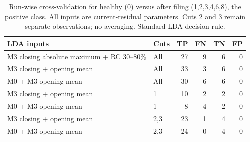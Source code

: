 \begin{table}[t]
\centering\scriptsize
\setlength{\tabcolsep}{3pt}
\caption{Run-wise cross-validation for healthy (0) versus after filing (1,2,3,4,6,8), the positive class. All inputs are current-residual parameters. Cuts 2 and 3 remain separate observations; no averaging. Standard LDA decision rule.}
\label{tab:scissors_binary_compact}
\begin{tabularx}{\columnwidth}{@{}Xlrrrr@{}}
\toprule
LDA inputs & Cuts & TP & FN & TN & FP \\
\midrule
M3 closing absolute maximum + RC 30–80\% & All & 27 & 9 & 6 & 0 \\
M3 closing + opening mean & All & 33 & 3 & 6 & 0 \\
M0 + M3 opening mean & All & 30 & 6 & 6 & 0 \\
M3 closing + opening mean & 1 & 10 & 2 & 2 & 0 \\
M0 + M3 opening mean & 1 & 8 & 4 & 2 & 0 \\
M3 closing + opening mean & 2,3 & 23 & 1 & 4 & 0 \\
M0 + M3 opening mean & 2,3 & 24 & 0 & 4 & 0 \\
\bottomrule
\end{tabularx}
\end{table}